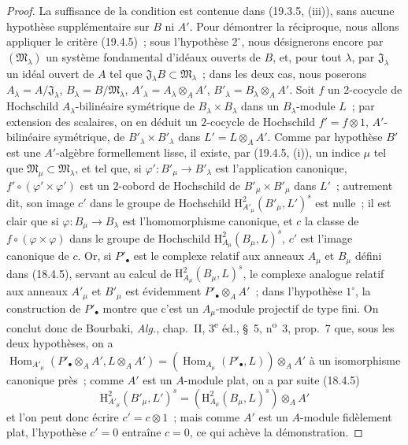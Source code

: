 \begin{proof}
La suffisance de la condition est contenue dans (19.3.5, (iii)), sans aucune
hypothèse supplémentaire sur $B$ ni $A'$. Pour démontrer la réciproque, nous
allons appliquer le critère (19.4.5)~; sous l'hypothèse $2^\circ$, nous
désignerons encore par $(\mathfrak M_\lambda)$ un système fondamental
d'idéaux ouverts de $B$, et, pour tout $\lambda$, par
$\mathfrak J_\lambda$ un idéal ouvert de $A$ tel que
$\mathfrak J_\lambda B\subset\mathfrak M_\lambda$~; dans les deux
cas, nous poserons
$A_\lambda=A/\mathfrak J_\lambda$,
$B_\lambda=B/\mathfrak M_\lambda$,
$A'_\lambda=A_\lambda\otimes_A A'$,
$B'_\lambda=B_\lambda\otimes_A A'$. Soit $f$ un $2$-cocycle de
Hochschild $A_\lambda$-bilinéaire symétrique de
$B_\lambda\times B_\lambda$ dans un $B_\lambda$-module $L$~; par
extension des scalaires, on en déduit un $2$-cocycle de Hochschild
$f'=f\otimes1$, $A'$-bilinéaire symétrique, de
$B'_\lambda\times B'_\lambda$ dans $L'=L\otimes_A A'$. Comme par
hypothèse $B'$ est une $A'$-algèbre formellement lisse, il existe, par (19.4.5,
(i)), un indice $\mu$ tel que
$\mathfrak M_\mu\subset\mathfrak M_\lambda$, et tel que, si
$\varphi':B'_\mu\to B'_\lambda$ est l'application canonique,
$f'\circ(\varphi'\times\varphi')$ est un $2$-cobord de Hochschild de
$B'_\mu\times B'_\mu$ dans $L'$~; autrement dit, son image $c'$ dans le
groupe de Hochschild
$\mathrm H^2_{A'_\mu}(B'_\mu,L')^s$ est nulle~; il est clair que si
$\varphi:B_\mu\to B_\lambda$ est l'homomorphisme canonique, et $c$ la
classe de $f\circ(\varphi\times\varphi)$ dans le groupe de Hochschild
$\mathrm H^2_{A_\mu}(B_\mu,L)^s$, $c'$ est l'image canonique de $c$.
Or, si $P'_\bullet$ est le complexe relatif aux anneaux $A_\mu$ et
$B_\mu$ défini dans (18.4.5), servant au calcul de
$\mathrm H^2_{A_\mu}(B_\mu,L)^s$, le complexe analogue relatif aux
anneaux $A'_\mu$ et $B'_\mu$ est évidemment
$P'_\bullet\otimes_A A'$~; dans l'hypothèse $1^\circ$, la construction de
$P'_\bullet$ montre que c'est un $A_\mu$-module projectif de type fini.
On conclut donc de Bourbaki, \emph{Alg.}, chap.~II, 3\textsuperscript{e} éd., §~5,
n\textsuperscript{o}~3, prop.~7 que, sous les deux hypothèses, on a
$\operatorname{Hom}_{A'_\mu}(P'_\bullet\otimes_A A',L\otimes_A A')
=(\operatorname{Hom}_{A_\mu}(P'_\bullet,L))\otimes_A A'$
à un isomorphisme canonique près~; comme $A'$ est un $A$-module plat, on a par
suite (18.4.5)
\[
  \mathrm H^2_{A'_\mu}(B'_\mu,L')^s
  =(\mathrm H^2_{A_\mu}(B_\mu,L)^s)\otimes_A A'
\]
et l'on peut donc écrire $c'=c\otimes1$~; mais comme $A'$ est un $A$-module
fidèlement plat, l'hypothèse $c'=0$ entraîne $c=0$, ce qui achève la
démonstration.
\end{proof}

